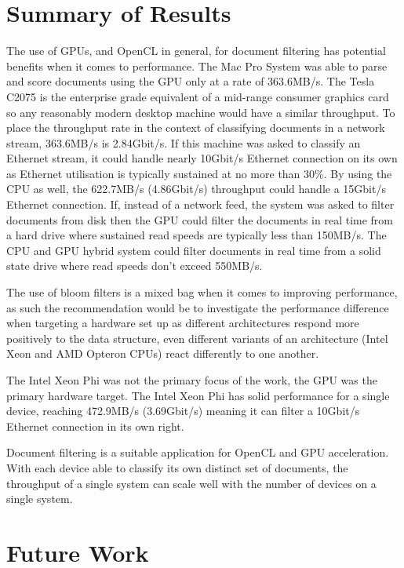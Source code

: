 \section{Summary of Results}

The use of GPUs, and OpenCL in general, for document filtering has potential
benefits when it comes to performance. The Mac Pro System was able to parse and
score documents using the GPU only at a rate of 363.6MB/s. The Tesla C2075 is
the enterprise grade equivalent of a mid-range consumer graphics card so any
reasonably modern desktop machine would have a similar throughput. To place the
throughput rate in the context of classifying documents in a network stream,
363.6MB/s is 2.84Gbit/s. If this machine was asked to classify an Ethernet
stream, it could handle nearly 10Gbit/s Ethernet connection on its own as
Ethernet utilisation is typically sustained at no more than 30\%. By using the
CPU as well, the 622.7MB/s (4.86Gbit/s) throughput could handle a 15Gbit/s
Ethernet connection. If, instead of a network feed, the system was asked to
filter documents from disk then the GPU could filter the documents in real time
from a hard drive where sustained read speeds are typically less than 150MB/s.
The CPU and GPU hybrid system could filter documents in real time from a solid
state drive where read speeds don't exceed 550MB/s.

The use of bloom filters is a mixed bag when it comes to improving performance,
as such the recommendation would be to investigate the performance difference
when targeting a hardware set up as different architectures respond more
positively to the data structure, even different variants of an architecture
(Intel Xeon and AMD Opteron CPUs) react differently to one another.

The Intel Xeon Phi was not the primary focus of the work, the GPU was the
primary hardware target. The Intel Xeon Phi has solid performance for a single
device, reaching 472.9MB/s (3.69Gbit/s) meaning it can filter a 10Gbit/s
Ethernet connection in its own right.

Document filtering is a suitable application for OpenCL and GPU acceleration.
With each device able to classify its own distinct set of documents, the
throughput of a single system can scale well with the number of devices on a
single system.

\section{Future Work}

